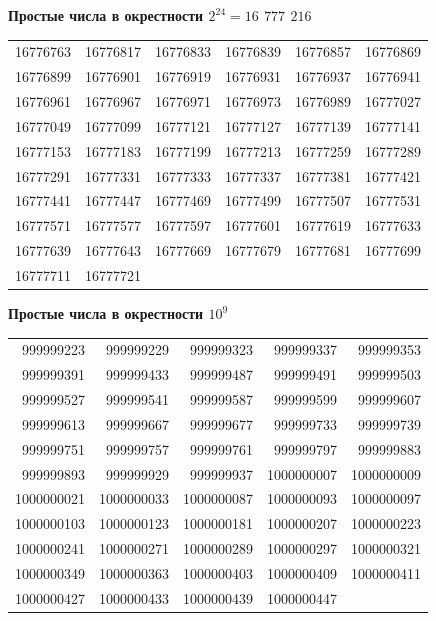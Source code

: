 \documentclass{mai_book}
\begin{document}
{\begin{center}
	{\large\textbf{Простые числа в окрестности $2^{24} = 16$ $777$ $216$}}
\end{center}
\hspace{0.7cm}\begin{tabular}{rrrrrr}
	16776763 & 16776817 & 16776833 & 16776839 & 16776857 & 16776869 \\
	16776899 & 16776901 & 16776919 & 16776931 & 16776937 & 16776941 \\
	16776961 & 16776967 & 16776971 & 16776973 & 16776989 & 16777027 \\
	16777049 & 16777099 & 16777121 & 16777127 & 16777139 & 16777141 \\
	16777153 & 16777183 & 16777199 & 16777213 & 16777259 & 16777289 \\
	16777291 & 16777331 & 16777333 & 16777337 & 16777381 & 16777421 \\
	16777441 & 16777447 & 16777469 & 16777499 & 16777507 & 16777531 \\
	16777571 & 16777577 & 16777597 & 16777601 & 16777619 & 16777633 \\
	16777639 & 16777643 & 16777669 & 16777679 & 16777681 & 16777699 \\
	16777711 & 16777721
\end{tabular}

\begin{center}
	{\large\textbf{Простые числа в окрестности $10^{9}$}}
\end{center}
\hspace{0.625cm}\begin{tabular}{rrrrr}
	999999223 & 999999229 & 999999323 & 999999337 & 999999353 \\
	999999391 & 999999433 & 999999487 & 999999491 & 999999503 \\
	999999527 & 999999541 & 999999587 & 999999599 & 999999607 \\
	999999613 & 999999667 & 999999677 & 999999733 & 999999739 \\
	999999751 & 999999757 & 999999761 & 999999797 & 999999883 \\
	999999893 & 999999929 & 999999937 & 1000000007 & 1000000009 \\
	1000000021 & 1000000033 & 1000000087 & 1000000093 & 1000000097 \\
	1000000103 & 1000000123 & 1000000181 & 1000000207 & 1000000223 \\
	1000000241 & 1000000271 & 1000000289 & 1000000297 & 1000000321 \\
	1000000349 & 1000000363 & 1000000403 & 1000000409 & 1000000411 \\
	1000000427 & 1000000433 & 1000000439 & 1000000447
\end{tabular}

}
\end{document}
